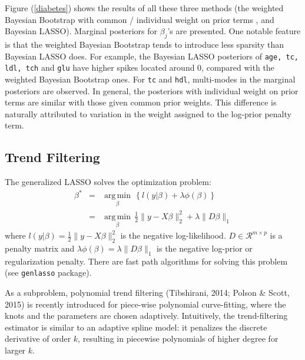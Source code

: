 \documentclass[12pt]{TD-CJS}
\newcommand{\R}{\mathcal{R}}
\DeclareMathOperator*{\argmin}{arg\,min}
\begin{document}
Figure (\ref{diabetes}) shows the results of all these three methods (the weighted Bayesian Bootstrap with common / individual weight on prior terms , and Bayesian LASSO). Marginal posteriors for $\beta_j$'s are presented. One notable feature is that the weighted Bayesian Bootstrap tends to introduce less sparsity than Bayesian LASSO does. For example, the Bayesian LASSO posteriors of {\tt age, tc, ldl, tch} and {\tt glu} have higher spikes located around 0, compared with the weighted Bayesian Bootstrap ones. For {\tt tc} and {\tt hdl}, multi-modes in the marginal posteriors are observed. In general, the posteriors with individual weight on prior terms are similar with those given common prior weights. This difference is naturally attributed to variation in the weight assigned to the log-prior penalty term. 

\subsection{Trend Filtering}
The generalized LASSO solves the optimization problem:
\begin{eqnarray}
\beta^* &=& \underset{\beta}{\argmin} \, \left\{ l(y|\beta) + \lambda\phi(\beta)  \right\}\\
&=& \underset{\beta}{\argmin} \, \frac{1}{2}\|y - X\beta\|_2^2 + \lambda \|D\beta\|_1
\end{eqnarray}
where $ l(y|\beta) = \frac{1}{2}\|y - X\beta\|_2^2 $ is the negative log-likelihood. $D \in \R^{m\times p}$ is a penalty matrix and $ \lambda\phi(\beta) = \lambda \|D\beta\|_1$ is the negative log-prior or regularization penalty. There are fast path algorithms for solving this problem (see {\tt genlasso} package).

As a subproblem, polynomial trend filtering (Tibshirani, 2014; Polson \& Scott, 2015) is recently introduced for piece-wise polynomial curve-fitting, where the knots and the parameters are chosen adaptively. Intuitively, the trend-filtering estimator is similar to an adaptive spline model: it penalizes the discrete derivative of order $k$, resulting in piecewise polynomials of higher degree for larger $k$.
\end{document}
